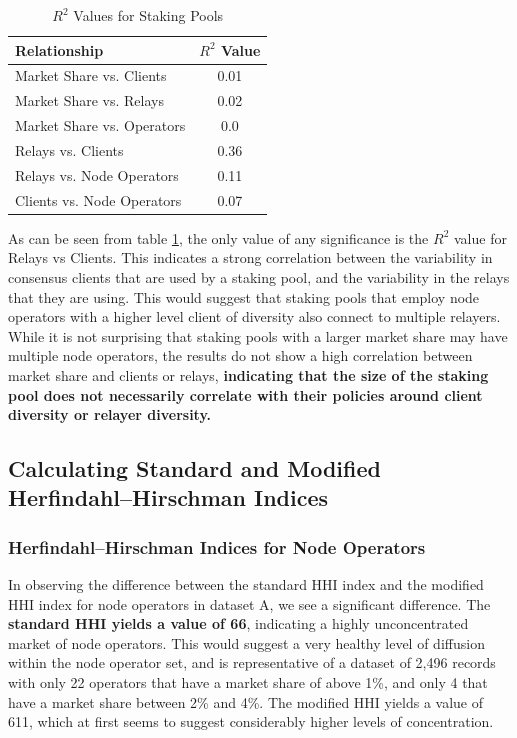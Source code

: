 \documentclass[conference]{IEEEtran}
\begin{document}
\begin{table}[htbp]
    \centering
    \normalsize
    \renewcommand{\arraystretch}{1.2}
    \begin{tabular}{|p{6cm}|c|}
        \hline
        \textbf{Relationship} & \textbf{$R^2$ Value} \\
        \hline
        Market Share vs. Clients & 0.01 \\ \hline
        Market Share vs. Relays & 0.02 \\ \hline
        Market Share vs. Operators & 0.0 \\ \hline
        Relays vs. Clients & 0.36 \\ \hline
        Relays vs. Node Operators & 0.11 \\ \hline
        Clients vs. Node Operators & 0.07 \\ \hline
    \end{tabular}
    \vspace{10pt}
    \caption{$R^2$ Values for Staking Pools}
    \label{tab:r2-value-staking-pools}
\end{table}

As can be seen from table \ref{tab:r2-value-staking-pools}, the only value of any significance is the $R^2$ value for Relays vs Clients.  This indicates a strong correlation between the variability in consensus clients that are used by a staking pool, and the variability in the relays that they are using.  This would suggest that staking pools that employ node operators with a higher level client of diversity also connect to multiple relayers.  While it is not surprising that staking pools with a larger market share may have multiple node operators, the results do not show a high correlation between market share and clients or relays, \textbf{indicating that the size of the staking pool does not necessarily correlate with their policies around client diversity or relayer diversity.}

\subsection{Calculating Standard and Modified Herfindahl–Hirschman Indices}

\subsubsection{Herfindahl–Hirschman Indices for Node Operators}

In observing the difference between the standard HHI index and the modified HHI index for node operators in dataset A, we see a significant difference.  The \textbf{standard HHI yields a value of 66}, indicating a highly unconcentrated market of node operators.  This would suggest a very healthy level of diffusion within the node operator set, and is representative of a dataset of 2,496 records with only 22 operators that have a market share of above 1\%, and only 4 that have a market share between 2\% and 4\%.  The modified HHI yields a value of 611, which at first seems to suggest considerably higher levels of concentration.
\end{document}
